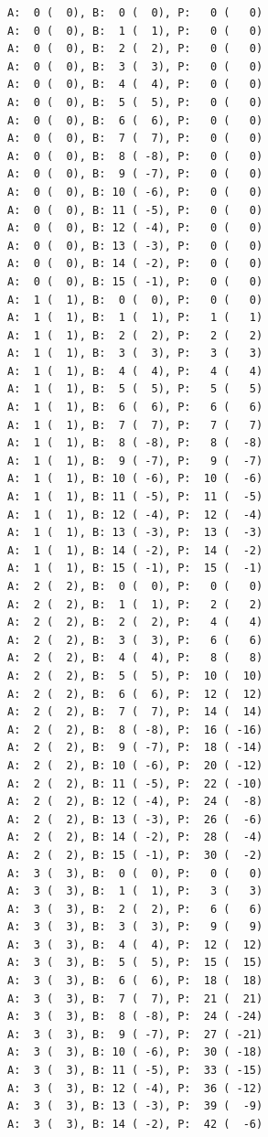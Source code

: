 \documentclass[12pt, titlepage]{report}
\begin{document}
\begin{framed}
\begin{verbatim}
A:  0 (  0), B:  0 (  0), P:   0 (   0)
A:  0 (  0), B:  1 (  1), P:   0 (   0)
A:  0 (  0), B:  2 (  2), P:   0 (   0)
A:  0 (  0), B:  3 (  3), P:   0 (   0)
A:  0 (  0), B:  4 (  4), P:   0 (   0)
A:  0 (  0), B:  5 (  5), P:   0 (   0)
A:  0 (  0), B:  6 (  6), P:   0 (   0)
A:  0 (  0), B:  7 (  7), P:   0 (   0)
A:  0 (  0), B:  8 ( -8), P:   0 (   0)
A:  0 (  0), B:  9 ( -7), P:   0 (   0)
A:  0 (  0), B: 10 ( -6), P:   0 (   0)
A:  0 (  0), B: 11 ( -5), P:   0 (   0)
A:  0 (  0), B: 12 ( -4), P:   0 (   0)
A:  0 (  0), B: 13 ( -3), P:   0 (   0)
A:  0 (  0), B: 14 ( -2), P:   0 (   0)
A:  0 (  0), B: 15 ( -1), P:   0 (   0)
A:  1 (  1), B:  0 (  0), P:   0 (   0)
A:  1 (  1), B:  1 (  1), P:   1 (   1)
A:  1 (  1), B:  2 (  2), P:   2 (   2)
A:  1 (  1), B:  3 (  3), P:   3 (   3)
A:  1 (  1), B:  4 (  4), P:   4 (   4)
A:  1 (  1), B:  5 (  5), P:   5 (   5)
A:  1 (  1), B:  6 (  6), P:   6 (   6)
A:  1 (  1), B:  7 (  7), P:   7 (   7)
A:  1 (  1), B:  8 ( -8), P:   8 (  -8)
A:  1 (  1), B:  9 ( -7), P:   9 (  -7)
A:  1 (  1), B: 10 ( -6), P:  10 (  -6)
A:  1 (  1), B: 11 ( -5), P:  11 (  -5)
A:  1 (  1), B: 12 ( -4), P:  12 (  -4)
A:  1 (  1), B: 13 ( -3), P:  13 (  -3)
A:  1 (  1), B: 14 ( -2), P:  14 (  -2)
A:  1 (  1), B: 15 ( -1), P:  15 (  -1)
A:  2 (  2), B:  0 (  0), P:   0 (   0)
A:  2 (  2), B:  1 (  1), P:   2 (   2)
A:  2 (  2), B:  2 (  2), P:   4 (   4)
A:  2 (  2), B:  3 (  3), P:   6 (   6)
A:  2 (  2), B:  4 (  4), P:   8 (   8)
A:  2 (  2), B:  5 (  5), P:  10 (  10)
A:  2 (  2), B:  6 (  6), P:  12 (  12)
A:  2 (  2), B:  7 (  7), P:  14 (  14)
A:  2 (  2), B:  8 ( -8), P:  16 ( -16)
A:  2 (  2), B:  9 ( -7), P:  18 ( -14)
A:  2 (  2), B: 10 ( -6), P:  20 ( -12)
A:  2 (  2), B: 11 ( -5), P:  22 ( -10)
A:  2 (  2), B: 12 ( -4), P:  24 (  -8)
A:  2 (  2), B: 13 ( -3), P:  26 (  -6)
A:  2 (  2), B: 14 ( -2), P:  28 (  -4)
A:  2 (  2), B: 15 ( -1), P:  30 (  -2)
A:  3 (  3), B:  0 (  0), P:   0 (   0)
A:  3 (  3), B:  1 (  1), P:   3 (   3)
A:  3 (  3), B:  2 (  2), P:   6 (   6)
A:  3 (  3), B:  3 (  3), P:   9 (   9)
A:  3 (  3), B:  4 (  4), P:  12 (  12)
A:  3 (  3), B:  5 (  5), P:  15 (  15)
A:  3 (  3), B:  6 (  6), P:  18 (  18)
A:  3 (  3), B:  7 (  7), P:  21 (  21)
A:  3 (  3), B:  8 ( -8), P:  24 ( -24)
A:  3 (  3), B:  9 ( -7), P:  27 ( -21)
A:  3 (  3), B: 10 ( -6), P:  30 ( -18)
A:  3 (  3), B: 11 ( -5), P:  33 ( -15)
A:  3 (  3), B: 12 ( -4), P:  36 ( -12)
A:  3 (  3), B: 13 ( -3), P:  39 (  -9)
A:  3 (  3), B: 14 ( -2), P:  42 (  -6)

\end{verbatim}
\end{framed}
\end{document}
